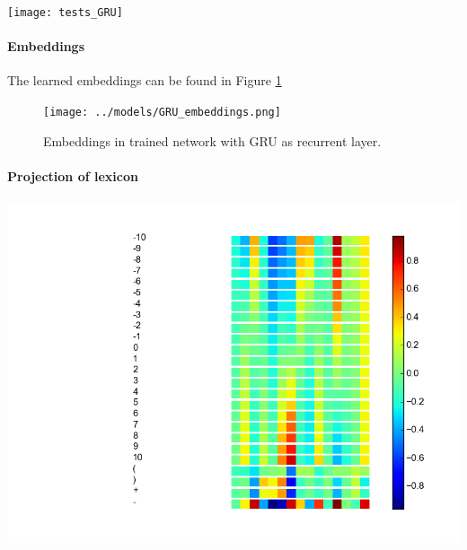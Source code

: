 \documentclass{article}
\begin{document}
\texttt{[image: tests\_GRU]}



\paragraph{Embeddings} The learned embeddings can be found in Figure \ref{fig:GRU_embeddings}

\begin{figure}
    \texttt{[image: ../models/GRU\_embeddings.png]}
    \caption{Embeddings in trained network with GRU as recurrent layer.}\label{fig:GRU_embeddings}
\end{figure}

\paragraph{Projection of lexicon}

\includegraphics[scale=0.7]{GRU_projections.png}
\end{document}
